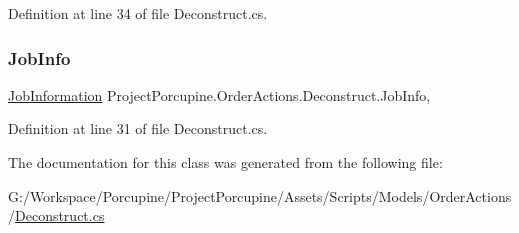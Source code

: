 Definition at line 34 of file Deconstruct.\+cs.

\mbox{\label{class_project_porcupine_1_1_order_actions_1_1_deconstruct_a6237e8f5b38b1b25c99be943cd7fa106}} 
\subsubsection{\texorpdfstring{Job\+Info}{JobInfo}}
{\footnotesize\ttfamily \hyperlink{class_project_porcupine_1_1_order_actions_1_1_order_action_1_1_job_information}{Job\+Information} Project\+Porcupine.\+Order\+Actions.\+Deconstruct.\+Job\+Info\hspace{0.3cm}{\ttfamily [get]}, {\ttfamily [set]}}



Definition at line 31 of file Deconstruct.\+cs.



The documentation for this class was generated from the following file\+:\begin{DoxyCompactItemize}
\item 
G\+:/\+Workspace/\+Porcupine/\+Project\+Porcupine/\+Assets/\+Scripts/\+Models/\+Order\+Actions/\hyperlink{_deconstruct_8cs}{Deconstruct.\+cs}\end{DoxyCompactItemize}
